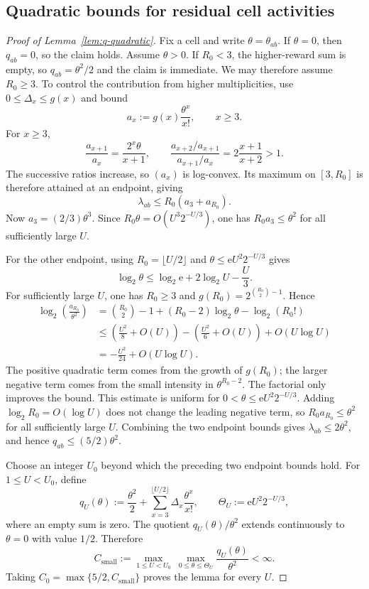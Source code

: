 \documentclass[a4paper,10pt,reqno]{amsart}
\numberwithin{equation}{section}
\theoremstyle{plain}
\theoremstyle{remark}
\begin{document}
\subsection{Quadratic bounds for residual cell activities}
\label{app:quadratic-activities}

\begin{proof}[Proof of Lemma~\ref{lem:q-quadratic}]
Fix a cell and write $\theta=\theta_{ab}$. If $\theta=0$, then
$q_{ab}=0$, so the claim holds. Assume $\theta>0$. If $R_0<3$, the
higher-reward sum is empty, so $q_{ab}=\theta^2/2$ and the claim is immediate.
We may therefore assume $R_0\ge3$. To control the contribution from higher
multiplicities, use $0\le\Delta_x\le g(x)$ and bound
\[
  a_x:=g(x)\frac{\theta^x}{x!},
  \qquad x\ge3.
\]
For $x\ge3$,
\[
  \frac{a_{x+1}}{a_x}
  =
  \frac{2^x\theta}{x+1},
  \qquad
  \frac{a_{x+2}/a_{x+1}}{a_{x+1}/a_x}
  =
  2\frac{x+1}{x+2}>1.
\]
The successive ratios increase, so $(a_x)$ is log-convex. Its maximum on
$[3,R_0]$ is therefore attained at an endpoint, giving
\[
  \lambda_{ab}
  \le
  R_0(a_3+a_{R_0}).
\]
Now $a_3=(2/3)\theta^3$. Since
$R_0\theta=O(U^3 2^{-U/3})$, one has $R_0a_3\le\theta^2$ for all sufficiently
large $U$.

For the other endpoint, using
$R_0=\lfloor U/2\rfloor$ and
$\theta\le\mathrm e U^2 2^{-U/3}$ gives
\[
  \log_2\theta
  \le
  \log_2\mathrm e+2\log_2U-\frac U3.
\]
For sufficiently large $U$, one has $R_0\ge3$ and
$g(R_0)=2^{\binom{R_0}2-1}$. Hence
\[
\begin{aligned}
  \log_2\!\left(\frac{a_{R_0}}{\theta^2}\right)
  &=
  \binom{R_0}2-1+(R_0-2)\log_2\theta-\log_2(R_0!)\\
  &\le
  \left(\frac{U^2}{8}+O(U)\right)
  -\left(\frac{U^2}{6}+O(U)\right)
  +O(U\log U)\\
  &=
  -\frac{U^2}{24}+O(U\log U).
\end{aligned}
\]
The positive quadratic term comes from the growth of $g(R_0)$; the larger
negative term comes from the small intensity in $\theta^{R_0-2}$. The
factorial only improves the bound. This estimate is uniform for
$0<\theta\le\mathrm e U^2 2^{-U/3}$. Adding $\log_2R_0=O(\log U)$ does not
change the leading negative term, so $R_0a_{R_0}\le\theta^2$ for all
sufficiently large $U$. Combining the two endpoint bounds gives
$\lambda_{ab}\le2\theta^2$, and hence $q_{ab}\le(5/2)\theta^2$.

Choose an integer $U_0$ beyond which the preceding two
endpoint bounds hold. For $1\le U<U_0$, define
\[
 q_U(\theta):=\frac{\theta^2}{2}
   +\sum_{x=3}^{\lfloor U/2\rfloor}
      \Delta_x\frac{\theta^x}{x!},
 \qquad
 \Theta_U:=\mathrm e U^2 2^{-U/3},
\]
where an empty sum is zero. The quotient $q_U(\theta)/\theta^2$ extends
continuously to $\theta=0$ with value $1/2$. Therefore
\[
 C_{\mathrm{small}}
 :=\max_{1\le U<U_0}\ \max_{0\le\theta\le\Theta_U}
     \frac{q_U(\theta)}{\theta^2}<\infty.
\]
Taking $C_0=\max\{5/2,C_{\mathrm{small}}\}$ proves the lemma for every $U$.
\end{proof}
\end{document}
